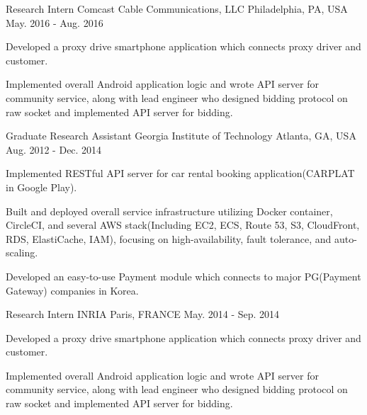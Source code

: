 \begin{cventries}
  \cventry
    {Research Intern} %
    {Comcast Cable Communications, LLC} %
    {Philadelphia, PA, USA} %
    {May. 2016 - Aug. 2016} %
    {
      \begin{cvitems} %
        \item {Developed a proxy drive smartphone application which connects proxy driver and customer.}
        \item {Implemented overall Android application logic and wrote API server for community service, along with lead engineer who designed bidding protocol on raw socket and implemented API server for bidding.}
      \end{cvitems}
    }

  \cventry
    {Graduate Research Assistant} %
    {Georgia Institute of Technology} %
    {Atlanta, GA, USA} %
    {Aug. 2012 - Dec. 2014} %
    {
      \begin{cvitems} %
        \item {Implemented RESTful API server for car rental booking application(CARPLAT in Google Play).}
        \item {Built and deployed overall service infrastructure utilizing Docker container, CircleCI, and several AWS stack(Including EC2, ECS, Route 53, S3, CloudFront, RDS, ElastiCache, IAM), focusing on high-availability, fault tolerance, and auto-scaling.}
        \item {Developed an easy-to-use Payment module which connects to major PG(Payment Gateway) companies in Korea.}
      \end{cvitems}
    }

  \cventry
    {Research Intern} %
    {INRIA} %
    {Paris, FRANCE} %
    {May. 2014 - Sep. 2014} %
    {
      \begin{cvitems} %
        \item {Developed a proxy drive smartphone application which connects proxy driver and customer.}
        \item {Implemented overall Android application logic and wrote API server for community service, along with lead engineer who designed bidding protocol on raw socket and implemented API server for bidding.}
      \end{cvitems}
    }
    

\end{cventries}
